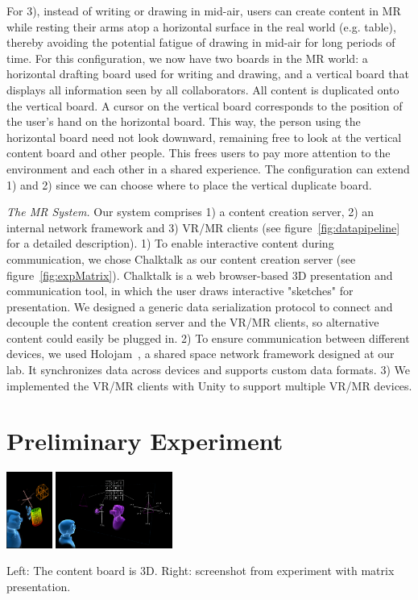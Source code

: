 \documentclass[sigchi-a]{acmart}
\begin{document}
For 3), instead of writing or drawing in mid-air, users can create content in MR
while resting their arms atop a horizontal surface in the real world (e.g. table), thereby avoiding the potential fatigue of drawing in mid-air for long periods of time. For this configuration, we now have two boards in the MR world: a horizontal drafting board used for writing and drawing, and a vertical board that displays all information seen by all collaborators. All content is duplicated onto the vertical board. A cursor on the vertical board corresponds to the position of the user's hand on the horizontal board. This way, the person using the horizontal board need not look downward, remaining free to look at the vertical content board and other people. This frees users to pay more attention to the environment and each other in a shared experience. The configuration can extend 1) and 2) since we can choose where to place the vertical duplicate board.

\textit{The MR System.} Our system comprises 1) a content creation server, 2) an internal network framework and 3) VR/MR clients (see figure~\ref{fig:datapipeline} for a detailed description). 1) To enable interactive content during communication, we chose Chalktalk as our content creation server (see figure~\ref{fig:expMatrix}). Chalktalk is a web browser-based 3D presentation and communication tool, 
in which the user draws interactive "sketches" for presentation. We designed a generic data serialization protocol to connect and decouple the content creation server and the VR/MR clients, so alternative content could easily be plugged in.
2) To ensure communication between different devices, we used Holojam~\cite{perlin2016future}, a shared space network framework designed at our lab.
It synchronizes data across devices and supports custom data formats.
3) We implemented the VR/MR clients with Unity to support multiple VR/MR devices.


\section{Preliminary Experiment}

\begin{marginfigure}
    \includegraphics[height = 2.5cm]{3d.png}
    \includegraphics[height = 2.5cm]{experimentMatrix.png}
    \caption{Left: The content board is 3D. Right: screenshot from experiment with matrix presentation.}
    \label{fig:expMatrix}
\end{marginfigure}
\end{document}
